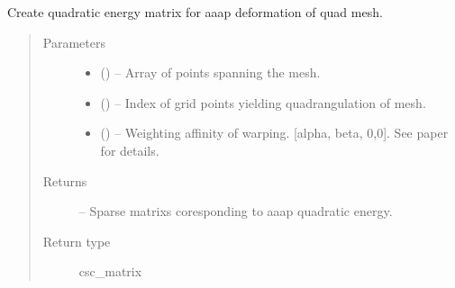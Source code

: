 \documentclass[letterpaper,10pt,english]{sphinxmanual}
\begin{document}
\begin{fulllineitems}
\label{\detokenize{image_aaap:image_aaap.construct_mesh_energy}}
Create quadratic energy matrix for aaap deformation of quad mesh.
\begin{quote}\begin{description}
\item[{Parameters}] \leavevmode\begin{itemize}
\item {} 
 () -- Array of points spanning the mesh.

\item {} 
 () -- Index of grid points yielding quadrangulation of mesh.

\item {} 
 () -- Weighting affinity of warping.
{[}alpha, beta, 0,0{]}. See paper for details.

\end{itemize}

\item[{Returns}] \leavevmode
{} -- Sparse matrixs coresponding to aaap quadratic energy.

\item[{Return type}] \leavevmode
csc\_matrix

\end{description}\end{quote}

\end{fulllineitems}

\end{document}
